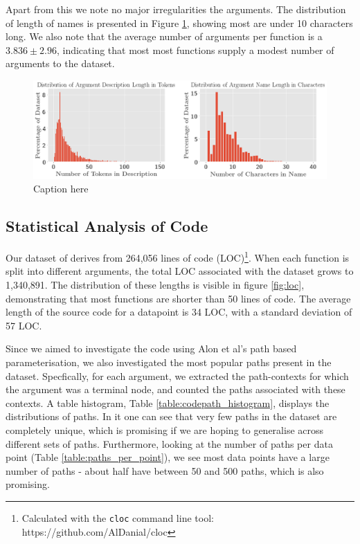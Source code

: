 Apart from this we note no major irregularities the arguments. The distribution of length of names is presented in Figure  \ref{fig:length_dist}, showing most are under 10 characters long.  We also note that the average number of arguments per function is a $3.836 \pm 2.96$, indicating that most most functions supply a modest number of arguments to the dataset.
\begin{figure}[tb]
    \centering
    \includegraphics[width=\linewidth]{ImagesCodeRelated/length_distribution.png}
    \caption{Caption here}
    \label{fig:length_dist}
\end{figure}

\subsection{Statistical Analysis of Code} %
\label{sub:statistical_analysis_of_code}

Our dataset of derives from 264,056 lines of code (LOC)\footnote{Calculated with the \texttt{cloc} command line tool: https://github.com/AlDanial/cloc}.
When each function is split into different arguments, the total LOC associated with the dataset grows to 1,340,891. The distribution of these lengths is visible in figure \ref{fig:loc}, demonstrating that most functions are shorter than 50 lines of code.
The average length of the source code for a datapoint is 34 LOC, with a standard deviation of 57 LOC.

Since we aimed to investigate the code using Alon et al's \cite{alon_general_2018} path based parameterisation, we also investigated the most popular paths present in the dataset. Specfically, for each argument, we extracted the path-contexts for which the argument was a terminal node, and counted the paths associated with these contexts.
A table histogram, Table \ref{table:codepath_histogram}, displays the distributions of paths. 
In it one can see that very few paths in the dataset are completely unique, which is promising if we are hoping to generalise across different sets of paths.
Furthermore, looking at the number of paths per data point (Table \ref{table:paths_per_point}), we see most data points have a large number of paths - about half have between 50 and 500 paths, which is also promising.

